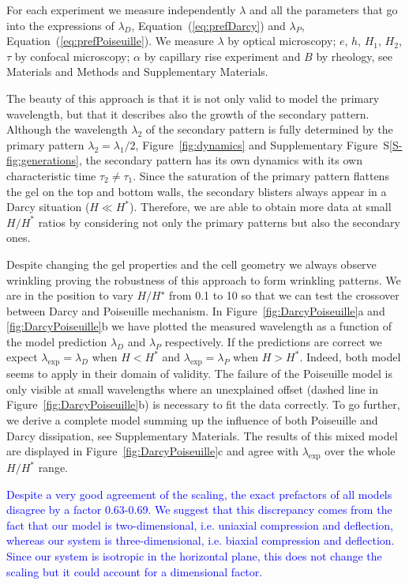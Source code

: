 \documentclass[twocolumn,superscriptaddress,showpacs,preprintnumbers, amsmath,amssymb,prl]{revtex4-1}
\begin{document}
For each experiment we measure independently $\lambda$ and all the parameters that go into the expressions of $\lambda_D$, Equation~(\ref{eq:prefDarcy}) and $\lambda_P$, Equation~(\ref{eq:prefPoiseuille}). We measure $\lambda$ by optical microscopy; $e$, $h$, $H_1$, $H_2$, $\tau$ by confocal microscopy; $\alpha$ by capillary rise experiment and $B$ by rheology, see Materials and Methods and Supplementary Materials.


The beauty of this approach is that it is not only valid to model the primary wavelength, but that it describes also the growth of the secondary pattern. Although the wavelength $\lambda_2$ of the secondary pattern is fully determined by the primary pattern $\lambda_2 = \lambda_1/2$, Figure~\ref{fig:dynamics} and Supplementary Figure~S\ref{S-fig:generations}, the secondary pattern has its own dynamics with its own characteristic time $\tau_2\neq\tau_1$. Since the saturation of the primary pattern flattens the gel on the top and bottom walls, the secondary blisters always appear in a Darcy situation ($H\ll H^*$). Therefore, we are able to obtain more data at small $H/H^*$ ratios by considering not only the primary patterns but also the secondary ones.


Despite changing the gel properties and the cell geometry we always observe wrinkling proving the robustness of this approach to form wrinkling patterns. We are in the position to vary $H/H^\star$ from 0.1 to 10 so that we can test the crossover between Darcy and Poiseuille mechanism. In Figure~\ref{fig:DarcyPoiseuille}a and \ref{fig:DarcyPoiseuille}b we have plotted the measured wavelength as a function of the model prediction $\lambda_D$ and $\lambda_P$ respectively. If the predictions are correct we expect $\lambda_\text{exp}=\lambda_D$ when $H<H^*$ and $\lambda_\text{exp}=\lambda_P$ when $H>H^*$. Indeed, both model seems to apply in their domain of validity. The failure of the Poiseuille model is only visible at small wavelengths where an unexplained offset (dashed line in Figure~\ref{fig:DarcyPoiseuille}b) is necessary to fit the data correctly. To go further, we derive a complete model summing up the influence of both Poiseuille and Darcy dissipation, see Supplementary Materials. The results of this mixed model are displayed in Figure~\ref{fig:DarcyPoiseuille}c and agree with $\lambda_\text{exp}$ over the whole $H/H^*$ range.

\textcolor{blue}{Despite a very good agreement of the scaling, the exact prefactors of all models disagree by a factor 0.63-0.69. We suggest that this discrepancy comes from the fact that our model is two-dimensional, i.e. uniaxial compression and deflection, whereas our system is three-dimensional, i.e. biaxial compression and deflection. Since our system is isotropic in the horizontal plane, this does not change the scaling but it could account for a dimensional factor.}
\end{document}
